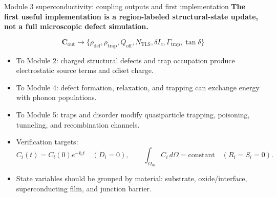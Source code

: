 \documentclass[aspectratio=169,10pt]{beamer}
\begin{document}
\begin{frame}{Module 3 superconductivity: coupling outputs and first implementation}
\footnotesize
\textbf{The first useful implementation is a region-labeled structural-state update, not a full microscopic defect simulation.}

\vspace{-0.2em}
\begin{equation*}
\boxed{
\mathbf C_{\mathrm{out}}
\longrightarrow
\{\rho_{\mathrm{def}},\rho_{\mathrm{trap}},Q_{\mathrm{off}},N_{\mathrm{TLS}},\delta I_c,\Gamma_{\mathrm{trap}},\tan\delta\}
}
\end{equation*}

\vspace{-0.15em}
\begin{itemize}
    \item To Module 2: charged structural defects and trap occupation produce electrostatic source terms and offset charge.
    \item To Module 4: defect formation, relaxation, and trapping can exchange energy with phonon populations.
    \item To Module 5: traps and disorder modify quasiparticle trapping, poisoning, tunneling, and recombination channels.
    \item Verification targets:
    \[
        C_i(t)=C_i(0)e^{-k_i t}\quad(D_i=0),
        \qquad
        \int_{\Omega_m}C_i\,d\Omega=\text{constant}\quad(R_i=S_i=0).
    \]
    \item State variables should be grouped by material: substrate, oxide/interface, superconducting film, and junction barrier.
\end{itemize}
\end{frame}
\end{document}
